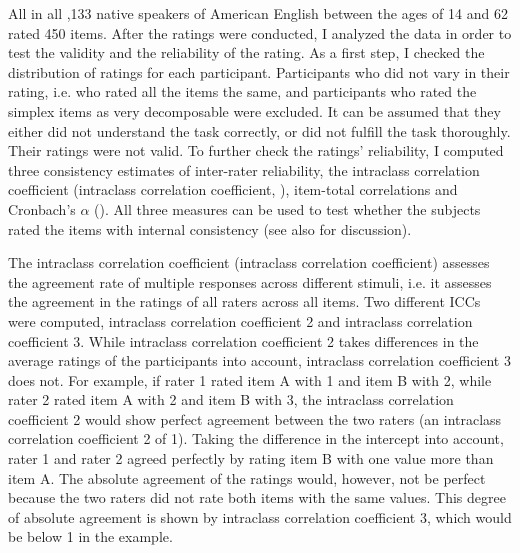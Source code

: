 All in all ,133 native speakers of American English between the ages of 14 and 62 rated 450 items. 
After the ratings were conducted, I analyzed the data in order to test the validity and the reliability of the rating. As a first step, I checked the distribution of ratings for each participant. Participants who did not vary in their rating, i.e. who rated all the items the same, and participants who rated the simplex items as very {decomposable} were excluded. It can be assumed that they either did not understand the task correctly, or did not fulfill the task thoroughly. Their ratings were not valid.
To further check the ratings' reliability, I computed three consistency estimates of inter-rater reliability, the intraclass correlation coefficient (intraclass correlation coefficient, \citealt{Bartko.1966}), item-total correlations and Cronbach's $\alpha$ (\citealt{Cronbach.1951}). All three measures can be used to test whether the subjects rated the items with internal consistency (see also \citealt[38ff.]{Stemler.2008} for discussion). 

The intraclass correlation coefficient (intraclass correlation coefficient) assesses the agreement rate of multiple responses across different stimuli, i.e. it assesses the agreement in the ratings of all raters across all items. Two different ICCs were computed, intraclass correlation coefficient 2 and intraclass correlation coefficient 3. While intraclass correlation coefficient 2 takes differences in the average ratings of the participants into account, intraclass correlation coefficient 3 does not. For example, if rater 1 rated item A with 1 and item B with 2, while rater 2 rated item A with 2 and item B with 3, the intraclass correlation coefficient 2 would show perfect agreement between the two raters (an intraclass correlation coefficient 2 of 1). Taking the difference in the intercept into account, rater 1 and rater 2 agreed perfectly by rating item B with one value more than item A. The absolute agreement of the ratings would, however, not be perfect because the two raters did not rate both items with the same values. This degree of absolute agreement is shown by intraclass correlation coefficient 3, which would be below 1 in the example.

